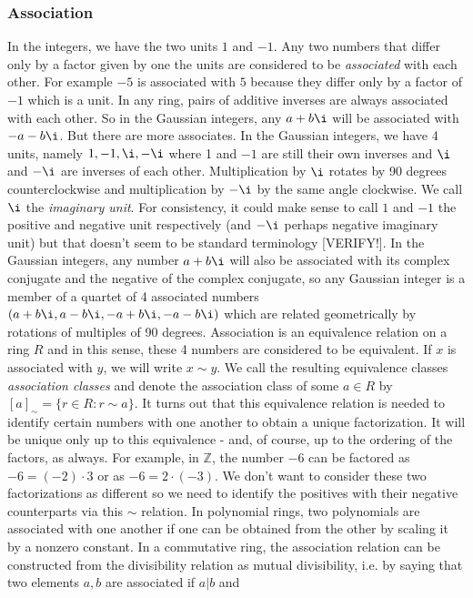 
%



\subsubsection{Association}
In the integers, we have the two units $1$ and $-1$. Any two numbers that differ only by a factor given by one the units are considered to be \emph{associated} with each other. For example $-5$ is associated with $5$ because they differ only by a factor of $-1$ which is a unit. In any ring, pairs of additive inverses are always associated with each other. So in the Gaussian integers, any $a + b \i$ will be associated with $-a - b \i$. But there are more associates. In the Gaussian integers, we have 4 units, namely $1,-1,\i,-\i$ where 1 and $-1$ are still their own inverses and $\i$ and $-\i$ are inverses of each other. Multiplication by $\i$ rotates by 90 degrees counterclockwise and multiplication by $-\i$ by the same angle clockwise. We call $\i$ the \emph{imaginary unit}. For consistency, it could make sense to call $1$ and $-1$ the positive and negative unit respectively (and $-\i$ perhaps negative imaginary unit) but that doesn't seem to be standard terminology [VERIFY!]. In the Gaussian integers, any number $a + b \i$ will also be associated with its complex conjugate and the negative of the complex conjugate, so any Gaussian integer is a member of a quartet of 4 associated numbers $(a + b\i, a - b \i, -a + b \i, -a - b \i)$ which are related geometrically by rotations of multiples of 90 degrees. Association is an equivalence relation on a ring $R$ and in this sense, these 4 numbers are considered to be equivalent. If $x$ is associated with $y$, we will write $x \sim y$. We call the resulting equivalence classes \emph{association classes} and denote the association class of some $a \in R$ by $[a]_{\sim} = \{r \in R: r \sim a\}$. It turns out that this equivalence relation is needed to identify certain numbers with one another to obtain a unique factorization. It will be unique only up to this equivalence - and, of course, up to the ordering of the factors, as always. For example, in $\mathbb{Z}$, the number $-6$ can be factored as $-6 = (-2) \cdot 3$ or as $-6 = 2 \cdot (-3)$. We don't want to consider these two factorizations as different so we need to identify the positives with their negative counterparts via this $\sim$ relation. In polynomial rings, two polynomials are associated with one another if one can be obtained from the other by scaling it by a nonzero constant. In a commutative ring, the association relation can be constructed from the divisibility relation as mutual divisibility, i.e. by saying that two elements $a,b$ are associated if $a|b$ and 